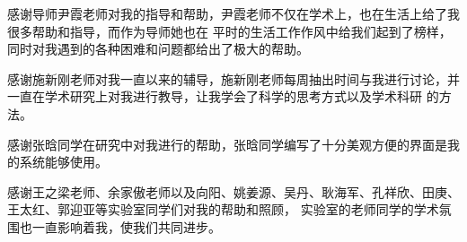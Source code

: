 
\begin{ack}
  感谢导师尹霞老师对我的指导和帮助，尹霞老师不仅在学术上，也在生活上给了我很多帮助和指导，而作为导师她也在
  平时的生活工作作风中给我们起到了榜样，同时对我遇到的各种困难和问题都给出了极大的帮助。

  感谢施新刚老师对我一直以来的辅导，施新刚老师每周抽出时间与我进行讨论，并一直在学术研究上对我进行教导，让我学会了科学的思考方式以及学术科研
  的方法。

  感谢张晗同学在研究中对我进行的帮助，张晗同学编写了十分美观方便的界面是我的系统能够使用。
  
  感谢王之梁老师、余家傲老师以及向阳、姚姜源、吴丹、耿海军、孔祥欣、田庚、王太红、郭迎亚等实验室同学们对我的帮助和照顾，
  实验室的老师同学的学术氛围也一直影响着我，使我们共同进步。
\end{ack}
